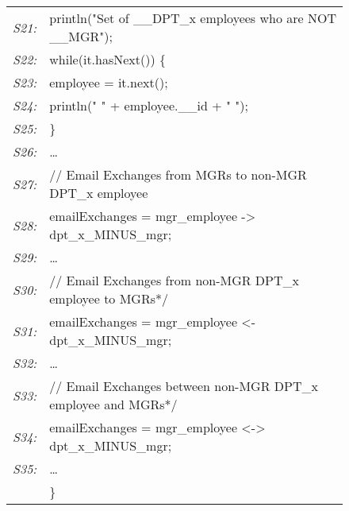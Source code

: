 \documentclass[letterpaper]{sig-alternate} \special{papersize=8.5in,11in}
\begin{document}
\begin{figure}
\begin{center}
{\begin{tabular}[b]{rl}
          {\em \scriptsize S21:}&  \quad println("Set of \_\_DPT\_x employees who are NOT  \_\_MGR"); \\
          {\em \scriptsize S22:}&  \quad while(it.hasNext()) \{\\
          {\em \scriptsize S23:}&  \quad \quad employee = it.next();\\
          {\em \scriptsize S24:}&  \quad \quad println(" " + employee.\_\_id + " ");\\
          {\em \scriptsize S25:}&  \quad \}  \\
          {\em \scriptsize S26:}&  \quad  \ldots \\
          {\em \scriptsize S27:}&  \quad // Email Exchanges from MGRs to non-MGR DPT\_x employee \\
          {\em \scriptsize S28:}&  \quad emailExchanges = mgr\_employee -> dpt\_x\_MINUS\_mgr;\\
          {\em \scriptsize S29:}&  \quad  \ldots \\
          {\em \scriptsize S30:}&  \quad // Email Exchanges from non-MGR DPT\_x employee to MGRs*/\\
          {\em \scriptsize S31:}&  \quad emailExchanges = mgr\_employee <- dpt\_x\_MINUS\_mgr;\\
          {\em \scriptsize S32:}&  \quad  \ldots \\
          {\em \scriptsize S33:}&  \quad // Email Exchanges between non-MGR DPT\_x employee and MGRs*/\\
          {\em \scriptsize S34:}&  \quad emailExchanges = mgr\_employee <-> dpt\_x\_MINUS\_mgr;\\
          {\em \scriptsize S35:}&  \quad  \ldots \\
	  &\}
        \end{tabular}
      }
\end{center}
\end{figure}
\end{document}
